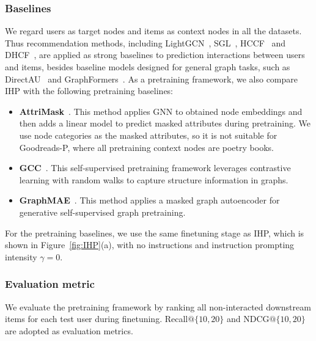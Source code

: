 \subsubsection{Baselines}
We regard users as target nodes and items as context nodes in all the datasets. 
Thus recommendation methods, including LightGCN~\cite{LightGCN}, SGL~\cite{sgl}, HCCF~\cite{hccf} and DHCF~\cite{dhcf}, are applied as strong baselines to prediction interactions between users and items, besides baseline models designed for general graph tasks, such as DirectAU~\cite{auloss} and GraphFormers~\cite{graphformer}. 
As a pretraining framework, we also compare IHP with the following pretraining baselines:
\begin{itemize}[leftmargin=*]
    \item \textbf{AttriMask}~\cite{weihua20}. This method applies GNN to obtained node embeddings and then adds a linear model to predict masked attributes during pretraining. We use node categories as the masked attributes, so it is not suitable for Goodreads-P, where all pretraining context nodes are poetry books.
    \item \textbf{GCC}~\cite{gcc}. This self-supervised pretraining framework leverages contrastive learning with random walks to capture structure information in graphs.
    \item \textbf{GraphMAE}~\cite{graphmae}. This method applies a masked graph autoencoder for generative self-supervised graph pretraining.
\end{itemize}
For the pretraining baselines, we use the same finetuning stage as IHP, which is shown in Figure~\ref{fig:IHP}(a), with no instructions and instruction prompting intensity $\gamma=0$.

\subsubsection{Evaluation metric}
We evaluate the pretraining framework by ranking all non-interacted downstream items for each test user during finetuning. Recall$@ \{10,20\}$ and NDCG$@\{10,20\}$ are adopted as evaluation metrics.

